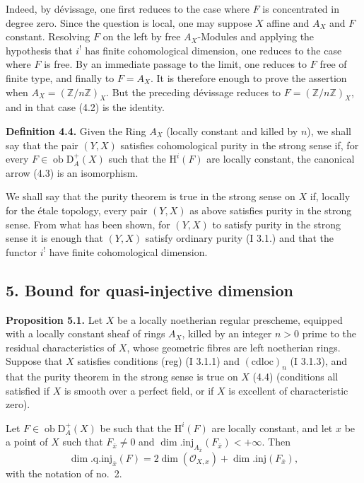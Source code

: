 \documentclass[11pt]{article}
\renewcommand{\H}{\mathrm{H}}
\newcommand{\D}{\mathrm{D}}
\newcommand{\Z}{\mathbb{Z}}
\newcommand{\ob}{\operatorname{ob}}
\begin{document}
Indeed, by dévissage, one first reduces to the case where $F$ is concentrated in degree zero. Since the question is local, one may suppose $X$ affine and $A_X$ and $F$ constant. Resolving $F$ on the left by free $A_X$-Modules and applying the hypothesis that $i^!$ has finite cohomological dimension, one reduces to the case where $F$ is free. By an immediate passage to the limit, one reduces to $F$ free of finite type, and finally to $F=A_X$. It is therefore enough to prove the assertion when $A_X=(\Z/n\Z)_X$. But the preceding dévissage reduces to $F=(\Z/n\Z)_X$, and in that case (4.2) is the identity.

\textbf{Definition 4.4.} Given the Ring $A_X$ (locally constant and killed by $n$), we shall say that the pair $(Y,X)$ satisfies cohomological purity in the strong sense if, for every $F\in\ob\D_A^+(X)$ such that the $\H^i(F)$ are locally constant, the canonical arrow (4.3) is an isomorphism.

We shall say that the purity theorem is true in the strong sense on $X$ if, locally for the étale topology, every pair $(Y,X)$ as above satisfies purity in the strong sense. From what has been shown, for $(Y,X)$ to satisfy purity in the strong sense it is enough that $(Y,X)$ satisfy ordinary purity (I 3.1.) and that the functor $i^!$ have finite cohomological dimension.

\subsection*{5. Bound for quasi-injective dimension}

\textbf{Proposition 5.1.} Let $X$ be a locally noetherian regular prescheme, equipped with a locally constant sheaf of rings $A_X$, killed by an integer $n>0$ prime to the residual characteristics of $X$, whose geometric fibres are left noetherian rings. Suppose that $X$ satisfies conditions (reg) (I 3.1.1) and $(\mathrm{cdloc})_n$ (I 3.1.3), and that the purity theorem in the strong sense is true on $X$ (4.4) (conditions all satisfied if $X$ is smooth over a perfect field, or if $X$ is excellent of characteristic zero).

Let $F\in\ob\D_A^+(X)$ be such that the $\H^i(F)$ are locally constant, and let $x$ be a point of $X$ such that $F_{\bar{x}}\neq0$ and $\dim.\mathrm{inj}_{A_{\bar{x}}}(F_{\bar{x}})<+\infty$. Then
\[
        \dim.\mathrm{q.inj}_{\bar{x}}(F)=2\dim(\mathcal{O}_{X,x})+\dim.\mathrm{inj}(F_{\bar{x}}),
\]
with the notation of no.~2.
\end{document}
